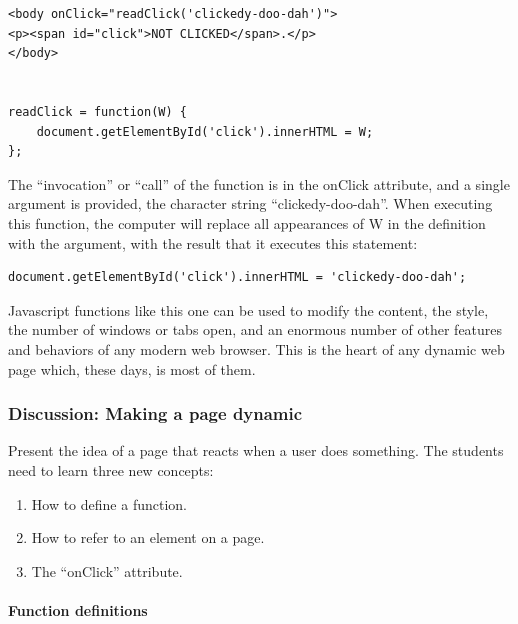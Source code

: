\documentclass[11pt]{article}
\begin{document}
\begin{verbatim}
<body onClick="readClick('clickedy-doo-dah')">
<p><span id="click">NOT CLICKED</span>.</p>
</body>


readClick = function(W) {
    document.getElementById('click').innerHTML = W;
};
\end{verbatim}

The ``invocation'' or ``call'' of the function is in the onClick
attribute, and a single argument is provided, the character string
``clickedy-doo-dah''.  When executing this function, the computer will
replace all appearances of W in the definition with the argument, with
the result that it executes this statement:

\begin{verbatim}
document.getElementById('click').innerHTML = 'clickedy-doo-dah';
\end{verbatim}

Javascript functions like this one can be used to modify the content,
the style, the number of windows or tabs open, and an enormous number
of other features and behaviors of any modern web browser.  This is
the heart of any dynamic web page which, these days, is most of them.

\subsubsection{Discussion: Making a page dynamic}

Present the idea of a page that reacts when a user does something.
The students need to learn three new concepts:

\begin{enumerate}

\item How to define a function.

\item How to refer to an element on a page.

\item The ``onClick'' attribute.

\end{enumerate}

\paragraph{Function definitions}
\end{document}
